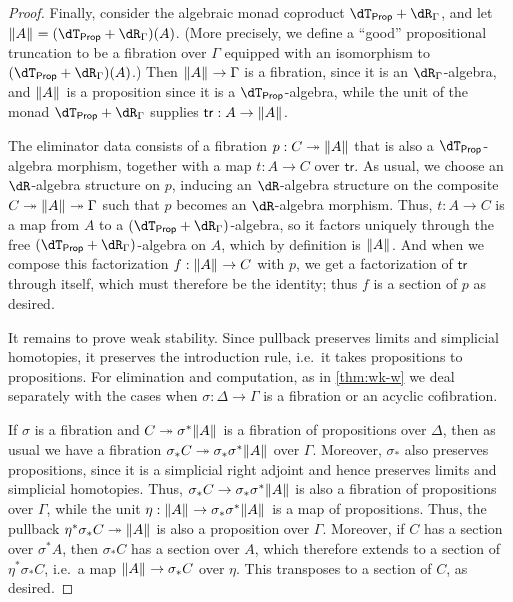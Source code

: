 \documentclass[referee]{psp}
\def\dtprop{\dT_{\mathsf{Prop}}}
\def\tr{\mathsf{tr}}
\begin{document}
\begin{proof}
  Finally, consider the algebraic monad coproduct $\dtprop + \dR_\Gamma$, and let $\brck A = (\dtprop+\dR_\Gamma)(A)$.
  (More precisely, we define a ``good'' propositional truncation to be a fibration over $\Gamma$ equipped with an isomorphism to $(\dtprop+\dR_\Gamma)(A)$.)
  Then $\mathopen{}\left\Vert A\right\Vert_{}\mathclose{} \to \Gamma$ is a fibration, since it is an $\dR_\Gamma$-algebra, and $\mathopen{}\left\Vert A\right\Vert_{}\mathclose{}$ is a proposition since it is a $\dtprop$-algebra, while the unit of the monad $\dtprop + \dR_\Gamma$ supplies $\tr:A\to\brck A$.

  The eliminator data consists of a fibration $p:C\twoheadrightarrow \mathopen{}\left\Vert A\right\Vert_{}\mathclose{}$ that is also a $\dtprop$-algebra morphism, together with a map $t:A\to C$ over $\tr$.
  As usual, we choose an $\dR$-algebra structure on $p$, inducing an $\dR$-algebra structure on the composite $C\twoheadrightarrow \mathopen{}\left\Vert A\right\Vert_{}\mathclose{} \twoheadrightarrow \Gamma$ such that $p$ becomes an $\dR$-algebra morphism.
  Thus, $t:A\to C$ is a map from $A$ to a $(\dtprop+\dR_\Gamma)$-algebra, so it factors uniquely through the free $(\dtprop+\dR_\Gamma)$-algebra on $A$, which by definition is $\mathopen{}\left\Vert A\right\Vert_{}\mathclose{}$.
  And when we compose this factorization $f:\mathopen{}\left\Vert A\right\Vert_{}\mathclose{} \to C$ with $p$, we get a factorization of $\tr$ through itself, which must therefore be the identity; thus $f$ is a section of $p$ as desired.

  It remains to prove weak stability.
  Since pullback preserves limits and simplicial homotopies, it preserves the introduction rule, i.e.\ it takes propositions to propositions.
  For elimination and computation, as in \cref{thm:wk-w} we deal separately with the cases when $\sigma:\Delta\to\Gamma$ is a fibration or an acyclic cofibration.

  If $\sigma$ is a fibration and $C\twoheadrightarrow \sigma^*\mathopen{}\left\Vert A\right\Vert_{}\mathclose{}$ is a fibration of propositions over $\Delta$, then as usual we have a fibration $\sigma_* C \twoheadrightarrow \sigma_* \sigma^* \mathopen{}\left\Vert A\right\Vert_{}\mathclose{}$ over $\Gamma$.
  Moreover, $\sigma_*$ also preserves propositions, since it is a simplicial right adjoint and hence preserves limits and simplicial homotopies.
  Thus, $\sigma_* C\to\sigma_*\sigma^*\mathopen{}\left\Vert A\right\Vert_{}\mathclose{}$ is also a fibration of propositions over $\Gamma$, while the unit $\eta : \mathopen{}\left\Vert A\right\Vert_{}\mathclose{} \to \sigma_* \sigma^* \mathopen{}\left\Vert A\right\Vert_{}\mathclose{}$ is a map of propositions.
  Thus, the pullback $\eta^* \sigma_* C \twoheadrightarrow \mathopen{}\left\Vert A\right\Vert_{}\mathclose{}$ is also a proposition over $\Gamma$.
  Moreover, if $C$ has a section over $\sigma^*A$, then $\sigma_* C$ has a section over $A$, which therefore extends to a section of $\eta^* \sigma_* C$, i.e.\ a map $\mathopen{}\left\Vert A\right\Vert_{}\mathclose{} \to \sigma_* C$ over $\eta$.
  This transposes to a section of $C$, as desired.


\end{proof}
\end{document}
